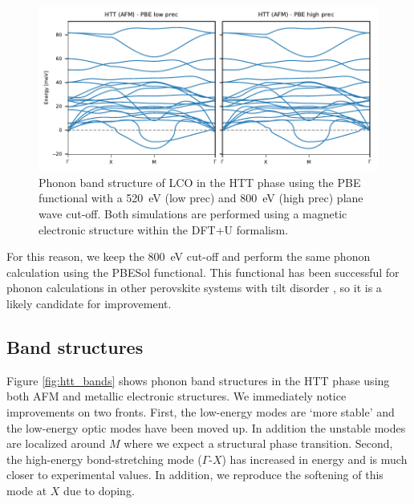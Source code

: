 \begin{figure}
	\centering
	\includegraphics[width=\textwidth]{fig/simulation/htt_pbe_bands.pdf}
	\caption[PBE Bands: Comparison wrt ENCUT]{Phonon band structure of LCO in the HTT phase using the PBE functional with a \SI{520}{\eV} (low prec) and \SI{800}{\eV} (high prec) plane wave cut-off. Both simulations are performed using a magnetic electronic structure within the DFT+U formalism.}  
	\label{fig:pbe_bands}
\end{figure}

For this reason, we keep the \SI{800}{\eV} cut-off and perform the same phonon calculation using the PBESol \cite{Csonka2009} functional. This functional has been successful for phonon calculations in other perovskite systems with tilt disorder \cite{DaSilva2015}, so it is a likely candidate for improvement. 

\subsection{Band structures}
Figure \ref{fig:htt_bands} shows phonon band structures in the HTT phase using both AFM and metallic electronic structures. We immediately notice improvements on two fronts. First, the low-energy modes are `more stable' and the low-energy optic modes have been moved up. In addition the unstable modes are localized around $M$ where we expect a structural phase transition. Second, the high-energy bond-stretching mode ($\Gamma$-$X$) has increased in energy and is much closer to experimental values. In addition, we reproduce the softening of this mode at $X$ due to doping.

